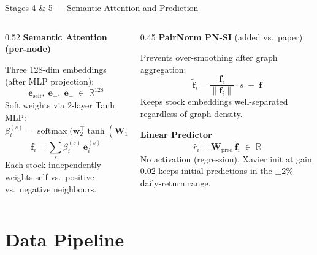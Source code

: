 \documentclass[aspectratio=169, 10pt]{beamer}
\newcommand{\myvec}[1]{\mathbf{#1}}
\begin{document}
\begin{frame}{Stages 4 \& 5 — Semantic Attention and Prediction}
  \begin{columns}[T]
    \begin{column}{0.52\textwidth}
      \textbf{Semantic Attention (per-node)}

      Three 128-dim embeddings (after MLP projection):
      \[ \myvec{e}_\text{self},\;\myvec{e}_+,\;\myvec{e}_- \;\in\;\mathbb{R}^{128} \]
      Soft weights via 2-layer Tanh MLP:
      \[
        \beta_i^{(s)} = \operatorname{softmax}\!\bigl(
          \myvec{w}_2^\top \tanh(\myvec{W}_1\,\myvec{e}_i^{(s)})
        \bigr)_{s=1}^3
      \]
      \[
        \myvec{f}_i = \textstyle\sum_{s} \beta_i^{(s)}\,\myvec{e}_i^{(s)}
      \]
      Each stock independently weights self vs.\ positive vs.\ negative
      neighbours.
    \end{column}
    \begin{column}{0.45\textwidth}
      \textbf{PairNorm PN-SI}
      \textcolor{negative}{\footnotesize(added vs.\ paper)}

      Prevents over-smoothing after graph aggregation:
      \[
        \tilde{\myvec{f}}_i =
          \frac{\myvec{f}_i}{\|\myvec{f}_i\|}\cdot s \;-\;\bar{\myvec{f}}
      \]
      Keeps stock embeddings well-separated regardless of graph density.

      \medskip
      \textbf{Linear Predictor}
      \[
        \hat{r}_i = \myvec{W}_\text{pred}\,\tilde{\myvec{f}}_i \;\in\;\mathbb{R}
      \]
      No activation (regression). Xavier init at gain 0.02 keeps initial
      predictions in the $\pm 2\%$ daily-return range.
    \end{column}
  \end{columns}
\end{frame}

\section{Data Pipeline}
\end{document}
